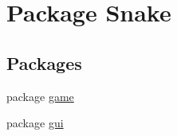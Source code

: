 \hypertarget{namespace_snake}{}\section{Package Snake}
\label{namespace_snake}
\subsection*{Packages}
\begin{DoxyCompactItemize}
\item 
package \mbox{\hyperlink{namespace_snake_1_1game}{game}}
\item 
package \mbox{\hyperlink{namespace_snake_1_1gui}{gui}}
\end{DoxyCompactItemize}
